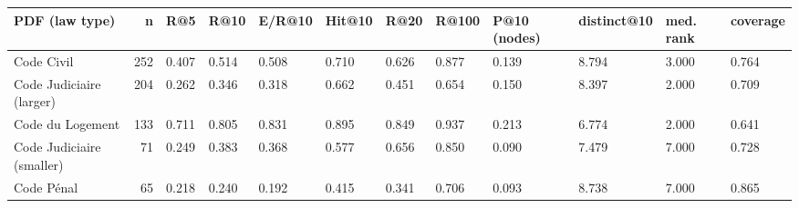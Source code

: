 \begin{tabular}{lrllllllllll}
\toprule
PDF (law type) & n & R@5 & R@10 & E/R@10 & Hit@10 & R@20 & R@100 & P@10 (nodes) & distinct@10 & med. rank & coverage \\
\midrule
Code Civil & 252 & 0.407 & 0.514 & 0.508 & 0.710 & 0.626 & 0.877 & 0.139 & 8.794 & 3.000 & 0.764 \\
Code Judiciaire (larger) & 204 & 0.262 & 0.346 & 0.318 & 0.662 & 0.451 & 0.654 & 0.150 & 8.397 & 2.000 & 0.709 \\
Code du Logement & 133 & 0.711 & 0.805 & 0.831 & 0.895 & 0.849 & 0.937 & 0.213 & 6.774 & 2.000 & 0.641 \\
Code Judiciaire (smaller) & 71 & 0.249 & 0.383 & 0.368 & 0.577 & 0.656 & 0.850 & 0.090 & 7.479 & 7.000 & 0.728 \\
Code Pénal & 65 & 0.218 & 0.240 & 0.192 & 0.415 & 0.341 & 0.706 & 0.093 & 8.738 & 7.000 & 0.865 \\
\bottomrule
\end{tabular}
